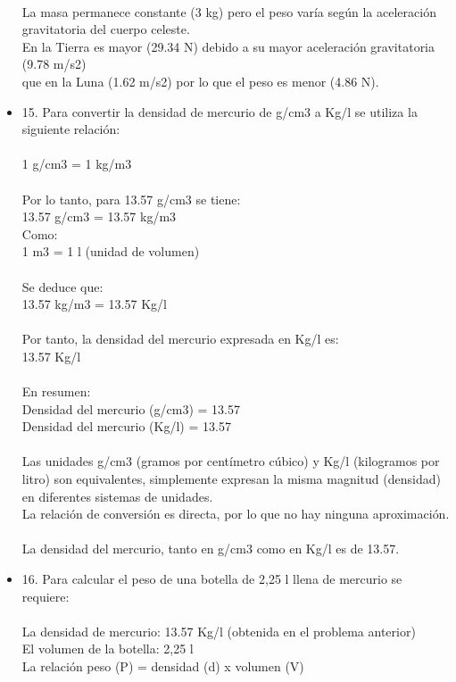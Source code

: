 \documentclass{article}
\begin{document}
\begin{itemize}
\\
La masa permanece constante (3 kg) pero el peso varía según la aceleración gravitatoria del cuerpo celeste.\\
En la Tierra es mayor (29.34 N) debido a su mayor aceleración gravitatoria (9.78 m/s2)\\
que en la Luna (1.62 m/s2) por lo que el peso es menor (4.86 N).\\
\item{15.}
Para convertir la densidad de mercurio de g/cm3 a Kg/l se utiliza la siguiente relación:\\
\\
1 g/cm3 = 1 kg/m3\\
\\
Por lo tanto, para 13.57 g/cm3 se tiene:\\
13.57 g/cm3 = 13.57 kg/m3\\
Como:\\
1 m3 = 1 l (unidad de volumen)\\
\\
Se deduce que:\\
13.57 kg/m3 = 13.57 Kg/l\\
\\
Por tanto, la densidad del mercurio expresada en Kg/l es:\\
13.57 Kg/l\\
\\
En resumen:\\
Densidad del mercurio (g/cm3) = 13.57\\
Densidad del mercurio (Kg/l) = 13.57\\
\\
Las unidades g/cm3 (gramos por centímetro cúbico) y Kg/l (kilogramos por litro) son equivalentes, simplemente expresan la misma magnitud (densidad) en diferentes sistemas de unidades.\\
La relación de conversión es directa, por lo que no hay ninguna aproximación.\\
\\
La densidad del mercurio, tanto en g/cm3 como en Kg/l es de 13.57.\\
\item{16.}
Para calcular el peso de una botella de 2,25 l llena de mercurio se requiere:\\
\\
La densidad de mercurio: 13.57 Kg/l (obtenida en el problema anterior)\\
El volumen de la botella: 2,25 l\\
La relación peso (P) = densidad (d) x volumen (V)\\

\end{itemize}
\end{document}
